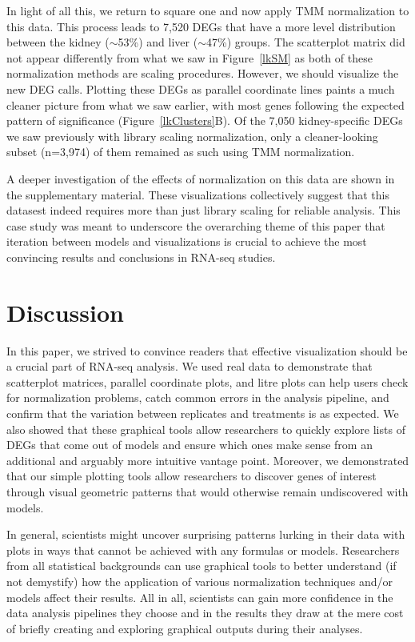 \documentclass{bioinfo}
\begin{document}
In light of all this, we return to square one and now apply TMM normalization to this data. This process leads to 7,520 DEGs that have a more level distribution between the kidney ($\sim$53\%) and liver ($\sim$47\%) groups. The scatterplot matrix did not appear differently from what we saw in Figure~\ref{lkSM} as both of these normalization methods are scaling procedures. However, we should visualize the new DEG calls. Plotting these DEGs as parallel coordinate lines paints a much cleaner picture from what we saw earlier, with most genes following the expected pattern of significance (Figure~\ref{lkClusters}B). Of the 7,050 kidney-specific DEGs we saw previously with library scaling normalization, only a cleaner-looking subset (n=3,974) of them remained as such using TMM normalization.

A deeper investigation of the effects of normalization on this data are shown in the supplementary material. These visualizations collectively suggest that this datasest indeed requires more than just library scaling for reliable analysis. This case study was meant to underscore the overarching theme of this paper that iteration between models and visualizations is crucial to achieve the most convincing results and conclusions in RNA-seq studies.

\section{Discussion}

In this paper, we strived to convince readers that effective visualization should be a crucial part of RNA-seq analysis. We used real data to demonstrate that scatterplot matrices, parallel coordinate plots, and litre plots can help users check for normalization problems, catch common errors in the analysis pipeline, and confirm that the variation between replicates and treatments is as expected. We also showed that these graphical tools allow researchers to quickly explore lists of DEGs that come out of models and ensure which ones make sense from an additional and arguably more intuitive vantage point. Moreover, we demonstrated that our simple plotting tools allow researchers to discover genes of interest through visual geometric patterns that would otherwise remain undiscovered with models.

In general, scientists might uncover surprising patterns lurking in their data with plots in ways that cannot be achieved with any formulas or models. Researchers from all statistical backgrounds can use graphical tools to better understand (if not demystify) how the application of various normalization techniques and/or models affect their results. All in all, scientists can gain more confidence in the data analysis pipelines they choose and in the results they draw at the mere cost of briefly creating and exploring graphical outputs during their analyses.
\end{document}
